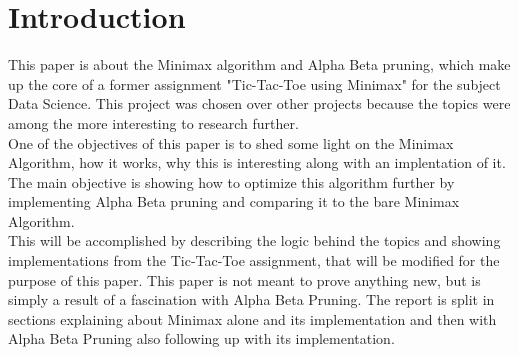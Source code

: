 \section{Introduction}
\label{sec:introduction} %
This paper is about the Minimax algorithm and Alpha Beta pruning, which make up the core of a former assignment 
"Tic-Tac-Toe using Minimax" for the subject Data Science. This project was chosen over other projects because 
the topics were among the more interesting to research further.
\\
One of the objectives of this paper is to shed some light on the Minimax Algorithm, 
how it works, why this is interesting along with an implentation of it.
The main objective is showing how to optimize this algorithm further by implementing Alpha Beta pruning and comparing 
it to the bare Minimax Algorithm.
\\
This will be accomplished by describing the logic behind the topics and showing implementations from the Tic-Tac-Toe assignment,
that will be modified for the purpose of this paper.
This paper is not meant to prove anything new, but is simply a result of a fascination with Alpha Beta Pruning.
The report is split in sections explaining about Minimax alone and its implementation and then with Alpha Beta Pruning 
also following up with its implementation.
\clearpage